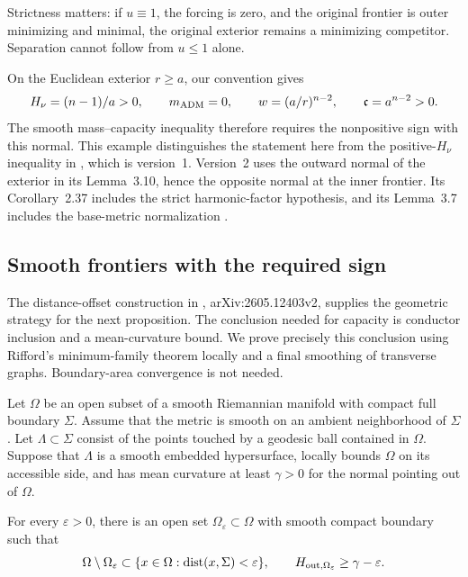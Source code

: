 Strictness matters: if $u\equiv1$, the forcing is zero, and the
original frontier is outer minimizing and minimal, the original
exterior remains a minimizing competitor. Separation cannot follow
from $u\le1$ alone.

\begin{remark}
On the Euclidean exterior $r\ge a$, our convention gives
\[
 H_\nu=(n-1)/a>0,\qquad m_{\rm ADM}=0,\qquad
 w=(a/r)^{n-2},\qquad\mathfrak c=a^{n-2}>0.
\]
The smooth mass--capacity inequality therefore requires the
nonpositive sign with this normal. This example distinguishes the
statement here from the positive-$H_\nu$ inequality in
\cite[Lemma~3.11]{BiZhu2026}, which is version~1. Version~2 uses
the outward normal of the exterior in its Lemma~3.10, hence the
opposite normal at the inner frontier. Its Corollary~2.37 includes
the strict harmonic-factor hypothesis, and its Lemma~3.7 includes
the base-metric normalization \cite{BiZhu2026v2}.
\end{remark}

\subsection{Smooth frontiers with the required sign}
\label{sec:rpi:smoothing}

The distance-offset construction in
\cite[Section~3 and Proposition~2.6]{BiZhuSmoothing2026},
arXiv:2605.12403v2, supplies the geometric strategy for the next
proposition. The conclusion needed for capacity is conductor inclusion and a
mean-curvature bound. We prove precisely this conclusion using
Rifford's minimum-family theorem locally and a final smoothing of
transverse graphs. Boundary-area convergence is not needed.

\begin{proposition}
\label{prop:rpi:one-sided-smoothing}
Let $\Omega$ be an open subset of a smooth Riemannian manifold with
compact full boundary $\Sigma$. Assume that the metric is smooth on
an ambient neighborhood of $\Sigma$. Let $\Lambda\subset\Sigma$
consist of the points touched by a geodesic ball contained in $\Omega$.
Suppose that $\Lambda$ is a smooth embedded hypersurface, locally
bounds $\Omega$ on its accessible side, and has mean curvature at
least $\gamma>0$ for the normal pointing out of $\Omega$.

For every $\varepsilon>0$, there is an open set
$\Omega_\varepsilon\subset\Omega$ with smooth compact boundary such
that
\[
 \Omega\setminus\Omega_\varepsilon
 \subset\{x\in\Omega:\operatorname{dist}(x,\Sigma)<\varepsilon\},
 \qquad
 H_{\mathrm{out},\Omega_\varepsilon}\ge\gamma-\varepsilon.
\]
\end{proposition}

